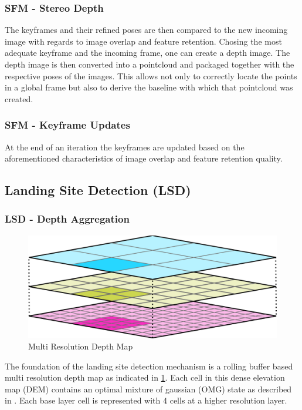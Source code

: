 \subsubsection{SFM - Stereo Depth}

The keyframes and their refined poses are then compared to the new incoming image with regards to image overlap and feature retention. Chosing the most adequate keyframe and the incoming frame, one can create a depth image. The depth image is then converted into a pointcloud and packaged together with the respective poses of the images. This allows not only to correctly locate the points in a global frame but also to derive the baseline with which that pointcloud was created.

\subsubsection{SFM - Keyframe Updates}

At the end of an iteration the keyframes are updated based on the aforementioned characteristics of image overlap and feature retention quality.

\subsection{Landing Site Detection (LSD)}\label{subsec:setup:LSD}

\subsubsection{LSD - Depth Aggregation}

\begin{figure}[ht!]
    \centering
    \includegraphics[scale=0.25]{images/setup/DEM.png}
    \caption{Multi Resolution Depth Map}
    \label{fig:DEM}
\end{figure}

The foundation of the landing site detection mechanism is a rolling buffer based multi resolution depth map as indicated in \cref{fig:DEM}. Each cell in this dense elevation map (DEM) contains an optimal mixture of gaussian (OMG) state as described in \citet{LSD2}. Each base layer cell is represented with 4 cells at a higher resolution layer.

